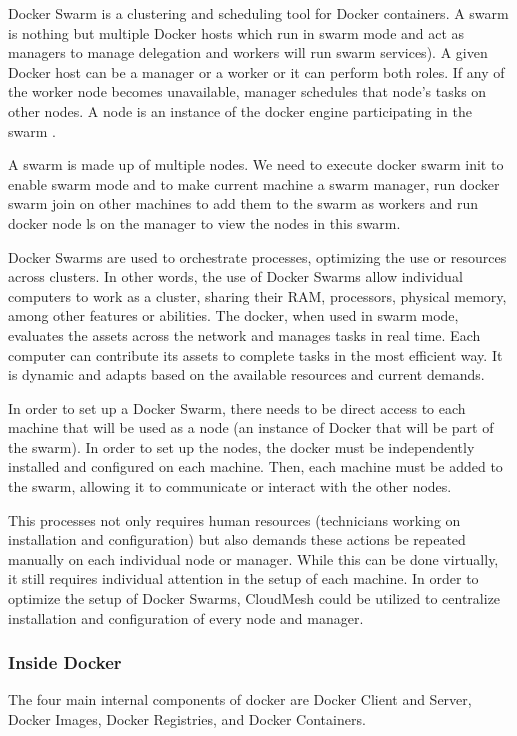 \documentclass[sigconf]{acmart}
\begin{document}
	Docker Swarm is a clustering and scheduling tool for Docker containers. A swarm is nothing but multiple Docker hosts which run in swarm mode and act as managers to manage delegation and workers will run swarm services). A given Docker host can be a manager or a worker or it can perform both roles. If any of the worker node becomes unavailable, manager schedules that node’s tasks on other nodes. A node is an instance of the docker engine participating in the swarm \cite{dockersdoc}.
	
	A swarm is made up of multiple nodes. We need to execute docker swarm init to enable swarm mode and to make current machine a swarm manager,
	run docker swarm join on other machines to add them to the swarm as workers and run docker node ls on the manager to view the nodes in this swarm.
	
	Docker Swarms are used to orchestrate processes, optimizing the use or resources across clusters.  In other words, the use of Docker Swarms allow individual computers to work as a cluster, sharing their RAM, processors, physical memory, among other features or abilities.    The docker, when used in swarm mode, evaluates the assets across the network and manages tasks in real time. Each computer can contribute its assets to complete tasks in the most efficient way. It is dynamic and adapts based on the available resources and current demands.   
	
	In order to set up a Docker Swarm, there needs to be direct access to each machine that will be used as a node (an instance of Docker that will be part of the swarm).  In order to set up  the nodes, the docker must be independently installed and configured on each machine.  Then, each machine must be added to the swarm, allowing it to communicate or interact with the other nodes.  
	
	This processes not only requires human resources (technicians working on installation and configuration) but also demands these actions be repeated manually on each individual node or manager. While this can be done virtually, it still requires individual attention in the setup of each machine.  In order to optimize the setup of Docker Swarms, CloudMesh could be utilized to centralize installation and configuration of every node and manager.  
	
	
	\subsubsection{Inside Docker}
	The four main internal components of docker are Docker Client and Server, Docker Images, Docker Registries, and Docker Containers.
\end{document}
